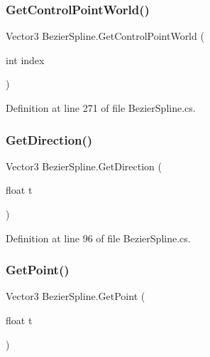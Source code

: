 \mbox{\label{class_bezier_spline_adb2e4e13eeea255f7f91d9815724f2d3}} 
\subsubsection{\texorpdfstring{Get\+Control\+Point\+World()}{GetControlPointWorld()}}
{\footnotesize\ttfamily Vector3 Bezier\+Spline.\+Get\+Control\+Point\+World (\begin{DoxyParamCaption}\item[{int}]{index }\end{DoxyParamCaption})}



Definition at line 271 of file Bezier\+Spline.\+cs.

\mbox{\label{class_bezier_spline_a24c9b2087b16b650871a9ed2355987cc}} 
\subsubsection{\texorpdfstring{Get\+Direction()}{GetDirection()}}
{\footnotesize\ttfamily Vector3 Bezier\+Spline.\+Get\+Direction (\begin{DoxyParamCaption}\item[{float}]{t }\end{DoxyParamCaption})}



Definition at line 96 of file Bezier\+Spline.\+cs.

\mbox{\label{class_bezier_spline_a4a9993e2dafa4a6b8819d94a25c70245}} 
\subsubsection{\texorpdfstring{Get\+Point()}{GetPoint()}}
{\footnotesize\ttfamily Vector3 Bezier\+Spline.\+Get\+Point (\begin{DoxyParamCaption}\item[{float}]{t }\end{DoxyParamCaption})}



